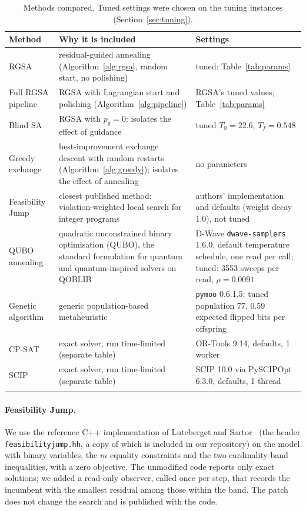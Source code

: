 \documentclass[pdflatex,sn-mathphys-num]{sn-jnl}
\theoremstyle{thmstyleone}
\theoremstyle{thmstylethree}
\begin{document}
\begin{table}[t]
\caption{Methods compared. Tuned settings were chosen on the tuning instances (Section~\ref{sec:tuning}).}\label{tab:methods}
\begin{tabular*}{\textwidth}{@{\extracolsep\fill}p{}p{}p{}}
\toprule
Method & Why it is included & Settings \\
\midrule
RGSA & residual-guided annealing (Algorithm~\ref{alg:rgsa}, random start, no polishing) & tuned: Table~\ref{tab:params} \\
Full RGSA pipeline & RGSA with Lagrangian start and polishing (Algorithm~\ref{alg:pipeline}) & RGSA's tuned values; Table~\ref{tab:params} \\
Blind SA & RGSA with $p_g=0$: isolates the effect of guidance & tuned $T_0=22.6$, $T_f=0.548$ \\
Greedy exchange & best-improvement exchange descent with random restarts (Algorithm~\ref{alg:greedy}); isolates the effect of annealing & no parameters \\
Feasibility Jump~\cite{fj2023} & closest published method: violation-weighted local search for integer programs & authors' implementation and defaults (weight decay 1.0), not tuned \\
QUBO annealing~\cite{lucas2014} & quadratic unconstrained binary optimisation (QUBO), the standard formulation for quantum and quantum-inspired solvers on QOBLIB & D-Wave \texttt{dwave-samplers} 1.6.0, default temperature schedule, one read per call; tuned: 3553 sweeps per read, $\rho=0.0091$ \\
Genetic algorithm~\cite{blank2020} & generic population-based metaheuristic & \texttt{pymoo} 0.6.1.5; tuned population 77, 0.59 expected flipped bits per offspring \\
\midrule
CP-SAT~\cite{cpsat} & exact solver, run time-limited (separate table) & OR-Tools 9.14, defaults, 1 worker \\
SCIP~\cite{scip} & exact solver, run time-limited (separate table) & SCIP 10.0 via PySCIPOpt 6.3.0, defaults, 1 thread \\
\botrule
\end{tabular*}
\end{table}

\paragraph{Feasibility Jump.} We use the reference C++ implementation of Luteberget and Sartor~\cite{fj2023} (the header \texttt{feasibilityjump.hh}, a copy of which is included in our repository) on the model with binary variables, the $m$ equality constraints and the two cardinality-band inequalities, with a zero objective. The unmodified code reports only exact solutions; we added a read-only observer, called once per step, that records the incumbent with the smallest residual among those within the band. The patch does not change the search and is published with the code.
\end{document}
